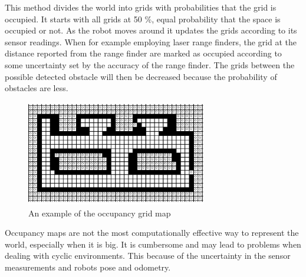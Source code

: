 This method divides the world into grids with probabilities that the grid is occupied. It
starts with all grids at 50 \%, equal probability that the space is occupied or not. As
the robot moves around it updates the grids according to its sensor readings. When for
example employing laser range finders, the grid at the distance reported from the range
finder are marked as occupied according to some uncertainty set by the accuracy of the
range finder. The grids between the possible detected obstacle will then be decreased
because the probability of obstacles are less. 
\begin{figure}[htbp]
    \centering
    \includegraphics[width=0.7\textwidth]{pics/occupancy-grid}
    \caption{An example of the occupancy grid map}
    \label{chap2:fig-occupancy-grid}
\end{figure}

Occupancy maps are not the most computationally effective way to represent the world,
especially when it is big. It is cumbersome and may lead to problems when dealing with
cyclic environments. This because of the uncertainty in the sensor measurements and robots
pose and odometry. 


